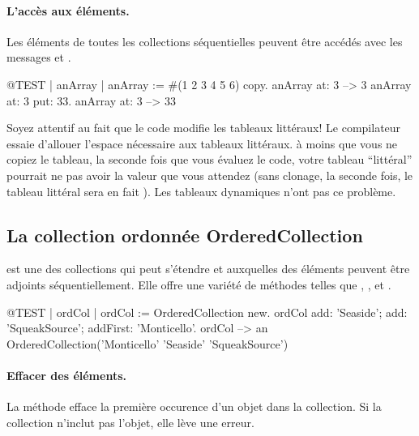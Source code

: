 \documentclass[a4paper,10pt,twoside]{book}
\begin{document}
\paragraph{L'accès aux éléments.}
Les éléments de toutes les collections séquentielles peuvent
être accédés avec les messages  et
 .

\begin{code}{@TEST | anArray |}
anArray := #(1 2 3 4 5 6) copy.
anArray at: 3 --> 3
anArray at: 3 put: 33.
anArray at: 3 --> 33
\end{code}

\noindent
Soyez attentif au fait que le code modifie les tableaux littéraux!
Le compilateur essaie d'allouer l'espace nécessaire aux tableaux littéraux.
à moins que vous ne copiez le tableau, la seconde fois que vous évaluez
le code, votre tableau ``littéral'' pourrait ne pas avoir la valeur que vous
attendez
(sans clonage, la seconde fois, le tableau littéral  sera en fait ).
Les tableaux dynamiques n'ont pas ce problème.

\subsection{La collection ordonnée OrderedCollection}
 est une des collections qui peut s'étendre
et auxquelles des éléments peuvent être adjoints séquentiellement.
Elle offre une variété de méthodes telles que , ,  et .

\begin{code}{@TEST | ordCol |}
ordCol := OrderedCollection new.
ordCol add: 'Seaside'; add: 'SqueakSource'; addFirst: 'Monticello'.
ordCol --> an OrderedCollection('Monticello' 'Seaside' 'SqueakSource')
\end{code}

\paragraph{Effacer des éléments.} La méthode   efface la première occurence d'un objet dans la collection. Si la collection n'inclut pas l'objet, elle lève une erreur.
\end{document}
